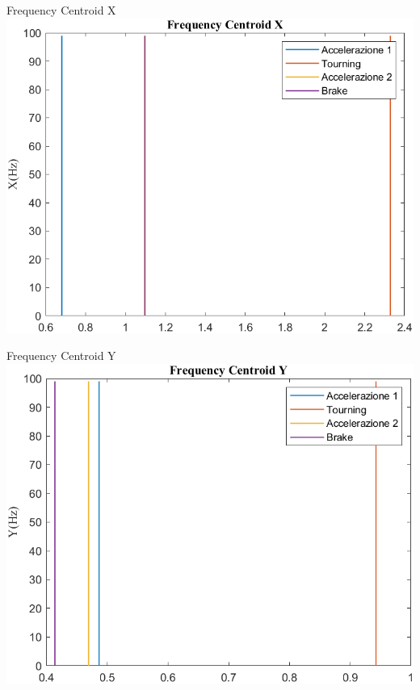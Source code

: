 \documentclass[beamer]{standalone}
\begin{document}
	\begin{frame}{{Frequency Centroid X}}
			\centering\includegraphics[height=.8\textheight]{figure/Acc/Trasformata/Frequency CentroidX}
	\end{frame}
	
	\begin{frame}{{Frequency Centroid Y}}
		\centering\includegraphics[height=.8\textheight]{figure/Acc/Trasformata/Frequency CentroidY}
	\end{frame}
	
\end{document}
